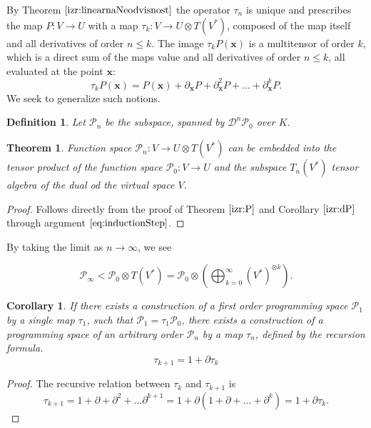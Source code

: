 \documentclass{article}
\newcommand{\x}{\mathbf{x}}
\newcommand{\dP}{\mathcal{P}}
\newcommand{\D}{\partial}
\newcommand{\DD}{\mathcal{D}}
\newcommand{\sumd}{\tau}
\newtheorem{definicija}{Definition}[section]
\newtheorem{izrek}{Theorem}[section]
\newtheorem{corollary}{Corollary}[section]
\begin{document}
  By Theorem $\ref{izr:linearnaNeodvisnost}$ the operator $\sumd_n$ is unique and prescribes the map $P: V\to U$ with a map $\sumd_k:V\to
U\otimes T(V^*)$, composed of the map itself and all derivatives of order $n\le k$. The image $\sumd_kP(\x)$ is a multitensor of order $k$, which is a direct sum of the maps value and all derivatives of order $n\le k$, all evaluated at the point $\x$:
\begin{equation}
  \label{eq:multi_odvod}
  \sumd_kP(\x) = P(\x)+\D_\x P + \D^2_\x P + \ldots + \D^k_\x P.
\end{equation}
We seek to generalize such notions.

\begin{definicija}\label{def:P_n}
Let $\dP_n$ be the subspace, spanned by $\DD^n\dP_0$ over $K$.
 \end{definicija}
 
 \begin{izrek}\label{izr:P_n}
 	Function space $\dP_n:V\to U\otimes T(V^*)$ can be embedded into the tensor
  product of the function space $\dP_0:V\to U$ and the subspace $T_n(V^*)$
  tensor algebra of the dual od the virtual space $V$. 
 \end{izrek}
 
 \begin{proof} Follows directly from the proof of Theorem $\ref{izr:P}$ and Corollary $\ref{izr:dP}$ through argument $\eqref{eq:inductionStep}$.
  \end{proof}
By taking the limit as $n\to \infty$, we see
 	
 	\begin{equation}
 	\label{eq:P_algebra}
 	 	    \dP_\infty < \dP_0\otimes T(V^*) = \dP_0 \otimes\left(\bigoplus_{k=0}^\infty (V^*)^{\otimes k} \right).
 	\end{equation}

  \begin{corollary}
  If there exists a construction of a first order programming space $\dP_1$ by a
  single map $\sumd_1$, such that $\dP_1=\sumd_1\dP_0$, there exists a
  construction of a programming space of an arbitrary order $\dP_n$ by a map
  $\sumd_n$, defined by the recursion formula.
  \begin{equation}
    \label{eq:potenca(1+d)}
    \sumd_{k+1}=1+\D\sumd_{k}
  \end{equation}

  \end{corollary}
  \begin{proof}
    The recursive relation between $\sumd_k$ and $\sumd_{k+1}$ is
    \begin{equation}
      \label{eq:rekurzija}
      \sumd_{k+1} = 1 + \D +\D^2+\ldots \D^{k+1} = 1+\D(1+\D+\ldots +\D^{k}) = 1+\D\sumd_k.
    \end{equation} 

  \end{proof}
       
\end{document}
